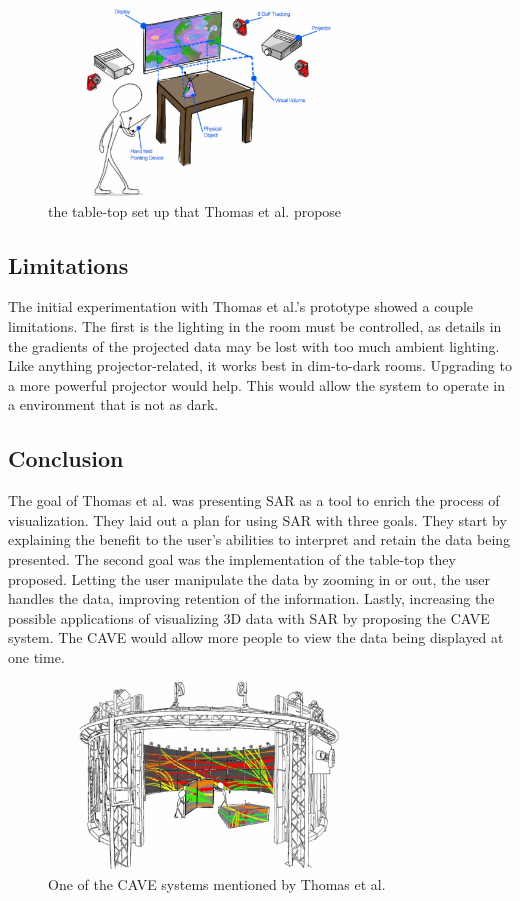 \documentclass{sig-alternate}
\begin{document}
\begin{figure}
	\includegraphics[width=8.5cm, height=5cm]{Tabletop}
	\caption{the table-top set up that Thomas et al. propose \cite{3D}}
	\label{fig:Tabletop}
\end{figure}

\subsection{Limitations}
\label{sec:Limitations}
The initial experimentation with Thomas et al.'s \cite{3D} prototype showed a couple limitations. The first is the lighting in the room must be controlled, as details in the gradients of the projected data may be lost with too much ambient lighting. Like anything projector-related, it works best in dim-to-dark rooms. Upgrading to a more powerful projector would help. This would allow the system to operate in a environment that is not as dark. 

\subsection{Conclusion}
\label{sec:Conclusion}
The goal of Thomas et al. \cite{3D} was presenting SAR as a tool to enrich the process of visualization. They laid out a plan for using SAR with three goals. They start by explaining the benefit to the user's abilities to interpret and retain the data being presented. The second goal was the implementation of the table-top they proposed. Letting the user manipulate the data by zooming in or out, the user handles the data, improving retention of the information. Lastly, increasing the possible applications of visualizing 3D data with SAR by proposing the CAVE system. The CAVE would allow more people to view the data being displayed at one time.

\begin{figure}
	\includegraphics[width=8.5cm, height=5cm]{Cave}
	\caption{One of the CAVE systems mentioned by Thomas et al. \cite{3D}}
	\label{fig:Cave}
\end{figure}  
\end{document}
